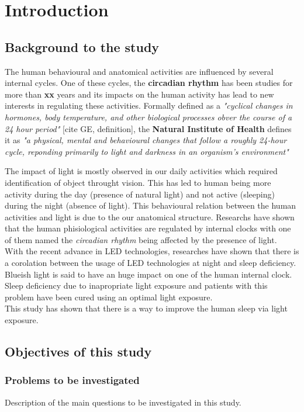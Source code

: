 \chapter{Introduction}

\section{Background to the study}
The human behavioural and anatomical activities are influenced by several internal cycles. One of these cycles, the \textbf{circadian rhythm} has been studies for more than \textbf{xx} years and its impacts on the human activity has lead to new interests in regulating these activities. Formally defined as a \textit{"cyclical changes in hormones, body temperature, and other biological processes obver the course of a 24 hour period"} [cite GE, definition], the \textbf{Natural Institute of Health} defines it as \textit{"a physical, mental and behavioural changes that follow a roughly 24-hour cycle, reponding primarily to light and darkness in an organism's environment"}

 The impact of light is mostly observed in our daily activities which required identification of object throught vision. This has led to human being more activity during the day (presence of natural light) and not active (sleeping) during the night (absence of light). This behavioural relation between the human activities and light is due to the our anatomical structure. Researchs have shown that the human phisiological activities are regulated by internal clocks with one of them named the \textit{circadian rhythm} being affected by the presence of light.\\
    
With the recent advance in LED technologies, researches have shown that there is a corolation between the usage of LED technologies at night and sleep deficiency. Blueish light is said to have an huge impact on one of the human internal clock. Sleep deficiency due to inapropriate light exposure and patients with this problem have been cured using an optimal light exposure.\\
This study has shown that there is a way to improve the human sleep via light exposure. 
\section{Objectives of this study}
\subsection{Problems to be investigated}
Description of the main questions to be investigated in this study.
